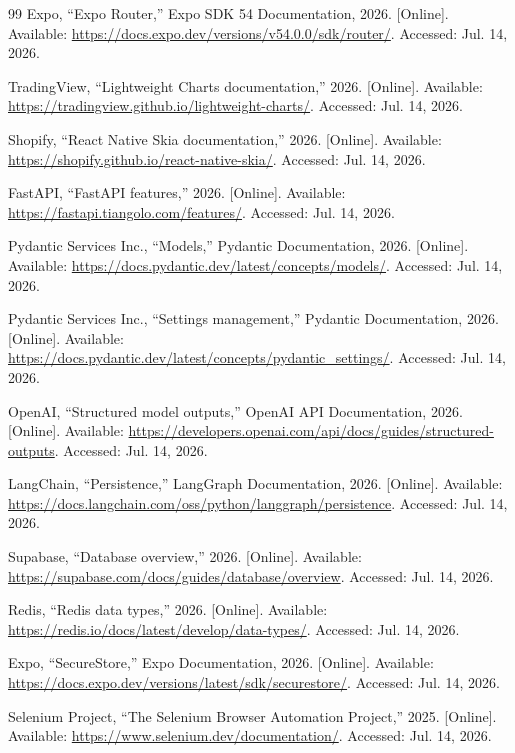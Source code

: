 \documentclass[12pt,a4paper,oneside]{report}
\begin{document}
\begin{thebibliography}{99}
Expo, ``Expo Router,'' Expo SDK 54 Documentation, 2026. [Online]. Available: \url{https://docs.expo.dev/versions/v54.0.0/sdk/router/}. Accessed: Jul. 14, 2026.

TradingView, ``Lightweight Charts documentation,'' 2026. [Online]. Available: \url{https://tradingview.github.io/lightweight-charts/}. Accessed: Jul. 14, 2026.

Shopify, ``React Native Skia documentation,'' 2026. [Online]. Available: \url{https://shopify.github.io/react-native-skia/}. Accessed: Jul. 14, 2026.

FastAPI, ``FastAPI features,'' 2026. [Online]. Available: \url{https://fastapi.tiangolo.com/features/}. Accessed: Jul. 14, 2026.

Pydantic Services Inc., ``Models,'' Pydantic Documentation, 2026. [Online]. Available: \url{https://docs.pydantic.dev/latest/concepts/models/}. Accessed: Jul. 14, 2026.

Pydantic Services Inc., ``Settings management,'' Pydantic Documentation, 2026. [Online]. Available: \url{https://docs.pydantic.dev/latest/concepts/pydantic_settings/}. Accessed: Jul. 14, 2026.

OpenAI, ``Structured model outputs,'' OpenAI API Documentation, 2026. [Online]. Available: \url{https://developers.openai.com/api/docs/guides/structured-outputs}. Accessed: Jul. 14, 2026.

LangChain, ``Persistence,'' LangGraph Documentation, 2026. [Online]. Available: \url{https://docs.langchain.com/oss/python/langgraph/persistence}. Accessed: Jul. 14, 2026.

Supabase, ``Database overview,'' 2026. [Online]. Available: \url{https://supabase.com/docs/guides/database/overview}. Accessed: Jul. 14, 2026.

Redis, ``Redis data types,'' 2026. [Online]. Available: \url{https://redis.io/docs/latest/develop/data-types/}. Accessed: Jul. 14, 2026.

Expo, ``SecureStore,'' Expo Documentation, 2026. [Online]. Available: \url{https://docs.expo.dev/versions/latest/sdk/securestore/}. Accessed: Jul. 14, 2026.

Selenium Project, ``The Selenium Browser Automation Project,'' 2025. [Online]. Available: \url{https://www.selenium.dev/documentation/}. Accessed: Jul. 14, 2026.


\end{thebibliography}
\end{document}

